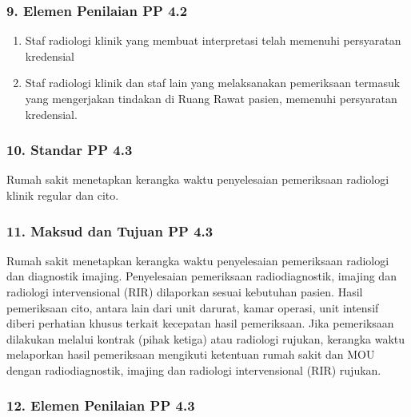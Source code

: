 \documentclass[
]{book}
\providecommand{\tightlist}{%
  \setlength{\itemsep}{0pt}\setlength{\parskip}{0pt}}
\begin{document}
\hypertarget{elemen-penilaian-pp-4.2}{%
\subsubsection*{9. Elemen Penilaian PP 4.2}\label{elemen-penilaian-pp-4.2}}

\begin{enumerate}
\def\labelenumi{\alph{enumi}.}
\tightlist
\item
  Staf radiologi klinik yang membuat interpretasi telah memenuhi persyaratan kredensial
\item
  Staf radiologi klinik dan staf lain yang melaksanakan pemeriksaan termasuk yang mengerjakan tindakan di Ruang Rawat pasien, memenuhi persyaratan kredensial.
\end{enumerate}

\hypertarget{standar-pp-4.3}{%
\subsubsection*{10. Standar PP 4.3}\label{standar-pp-4.3}}

Rumah sakit menetapkan kerangka waktu penyelesaian pemeriksaan radiologi klinik regular dan cito.

\hypertarget{maksud-dan-tujuan-pp-4.3}{%
\subsubsection*{11. Maksud dan Tujuan PP 4.3}\label{maksud-dan-tujuan-pp-4.3}}

Rumah sakit menetapkan kerangka waktu penyelesaian pemeriksaan radiologi dan diagnostik imajing. Penyelesaian pemeriksaan radiodiagnostik, imajing dan radiologi intervensional (RIR) dilaporkan sesuai kebutuhan pasien. Hasil pemeriksaan cito, antara lain dari unit darurat, kamar operasi, unit intensif diberi perhatian khusus terkait kecepatan hasil pemeriksaan. Jika pemeriksaan dilakukan melalui kontrak (pihak ketiga) atau radiologi rujukan, kerangka waktu melaporkan hasil pemeriksaan mengikuti ketentuan rumah sakit dan MOU dengan radiodiagnostik, imajing dan radiologi intervensional (RIR) rujukan.

\hypertarget{elemen-penilaian-pp-4.3}{%
\subsubsection*{12. Elemen Penilaian PP 4.3}\label{elemen-penilaian-pp-4.3}}
\end{document}
